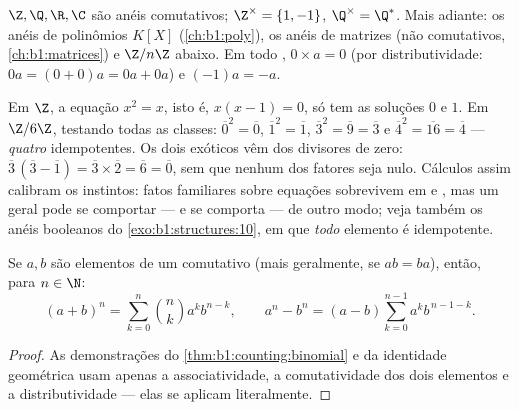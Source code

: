 \begin{example}\label{ex:b1:structures:rings}
$\Z, \Q, \R, \C$ são anéis comutativos; $\Z^\times = \{1, -1\}$,
$\Q^\times = \Q^*$. Mais adiante: os anéis de polinômios $K[X]$
(\cref{ch:b1:poly}), os anéis de matrizes (não comutativos,
\cref{ch:b1:matrices}) e $\Z/n\Z$ abaixo. Em todo , $0 \times
a = 0$ (por distributividade: $0a = (0+0)a = 0a + 0a$) e
$(-1)a = -a$.
\end{example}

\begin{example}\label{ex:b1:structures:idempotents}
Em $\Z$, a equação $x^2 = x$, isto é, $x(x - 1) = 0$, só tem
as soluções $0$ e $1$. Em $\Z/6\Z$, testando todas as classes:
$\overline0^2 = \overline0$, $\overline1^2 = \overline1$,
$\overline3^2 = \overline9 = \overline3$ e $\overline4^2 =
\overline{16} = \overline4$ --- \emph{quatro} idempotentes. Os dois
exóticos vêm dos divisores de zero: $\overline3\,(\overline3 -
\overline1) = \overline3 \times \overline2 = \overline6 =
\overline0$, sem que
nenhum dos fatores seja nulo. Cálculos assim calibram
os instintos: fatos familiares sobre equações sobrevivem em
 e , mas um  geral pode se comportar
--- e se comporta --- de outro modo; veja também os anéis booleanos do
\cref{exo:b1:structures:10}, em que \emph{todo} elemento é
idempotente.
\end{example}

\begin{proposition}\label{prop:b1:structures:binomial}
Se $a, b$ são elementos de um  comutativo (mais geralmente, se
$ab = ba$), então, para $n \in \N$:
\[
(a+b)^n = \sum_{k=0}^n \binom nk a^k b^{n-k},
\qquad
a^n - b^n = (a - b) \sum_{k=0}^{n-1} a^k b^{\,n-1-k} .
\]
\end{proposition}

\begin{proof}
As demonstrações do \cref{thm:b1:counting:binomial} e da identidade
geométrica usam apenas a associatividade, a comutatividade dos dois
elementos e a distributividade --- elas se aplicam literalmente.
\end{proof}

